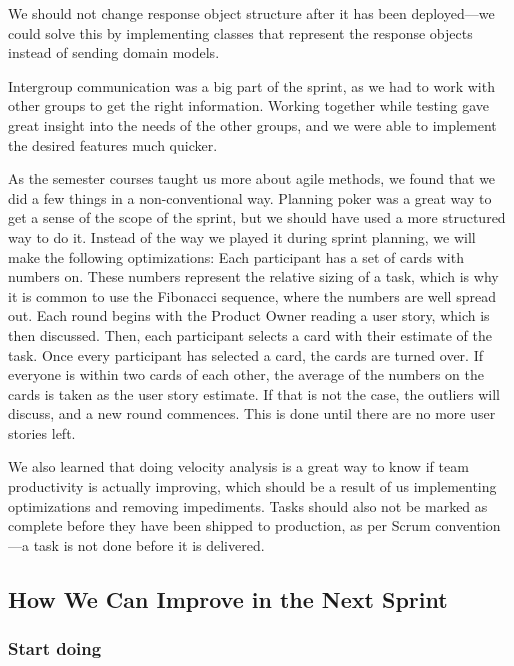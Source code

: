 We should not change response object structure after it has been deployed---we could solve this by implementing classes that represent the response objects instead of sending domain models. 

Intergroup communication was a big part of the sprint, as we had to work with other groups to get the right information. 
Working together while testing gave great insight into the needs of the other groups, and we were able to implement the desired features much quicker.

As the semester courses taught us more about agile methods, we found that we did a few things in a non-conventional way. Planning poker was a great way to get a sense of the scope of the sprint, but we should have used a more structured way to do it. 
Instead of the way we played it during sprint planning, we will make the following optimizations:
Each participant has a set of cards with numbers on. These numbers represent the relative sizing of a task, which is why it is common to use the Fibonacci sequence, where the numbers are well spread out.
Each round begins with the Product Owner reading a user story, which is then discussed. Then, each participant selects a card with their estimate of the task. Once every participant has selected a card, the cards are turned over. If everyone is within two cards of each other, the average of the numbers on the cards is taken as the user story estimate. If that is not the case, the outliers will discuss, and a new round commences.
This is done until there are no more user stories left\cite{sutherlandScrumArtDoing2014}.


We also learned that doing velocity analysis is a great way to know if team productivity is actually improving, which should be a result of us implementing optimizations and removing impediments.
Tasks should also not be marked as complete before they have been shipped to production, as per Scrum convention---a task is not done before it is delivered\cite{sutherlandScrumArtDoing2014}.

\subsection{How We Can Improve in the Next Sprint}

\subsubsection{Start doing}

